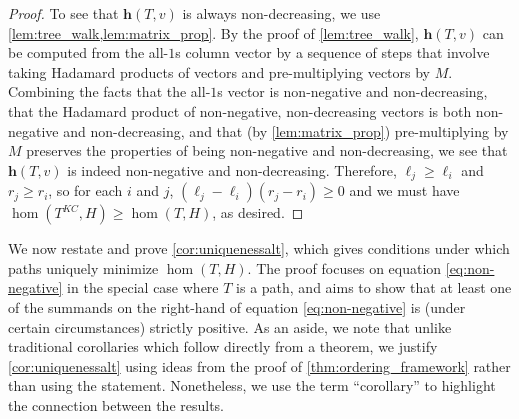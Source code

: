 \documentclass[11pt]{article}
\theoremstyle{definition}
\begin{document}
\begin{proof}
To see that $\mathbf{h}(T,v)$ is always non-decreasing, we use \cref{lem:tree_walk,lem:matrix_prop}. By the proof of \cref{lem:tree_walk}, $\mathbf{h}(T,v)$ can be computed from the all-$1$s column vector by a sequence of steps that involve taking Hadamard products of vectors and pre-multiplying vectors by $M$. Combining the facts that the all-$1$s vector is non-negative and non-decreasing, that the Hadamard product of non-negative, non-decreasing vectors is both non-negative and non-decreasing, and that (by \cref{lem:matrix_prop}) pre-multiplying by $M$ preserves the properties of being non-negative and non-decreasing, we see that $\mathbf{h}(T,v)$ is indeed non-negative and non-decreasing. Therefore, $\ell_j \ge \ell_i$ and $r_j \ge r_i$, so for each $i$ and $j$, $(\ell_j-\ell_i)(r_j-r_i) \ge 0$ and we must have $\hom(T^{KC},H) \ge \hom(T,H)$, as desired.
\end{proof}

We now restate and prove \cref{cor:uniquenessalt}, which gives conditions under which paths uniquely minimize $\hom(T,H)$. The proof focuses on equation \eqref{eq:non-negative} in the special case where $T$ is a path, and aims to show that at least one of the summands on the right-hand of equation \eqref{eq:non-negative} is (under certain circumstances) strictly positive. As an aside, we note that unlike traditional corollaries which follow directly from a theorem, we justify \cref{cor:uniquenessalt} using ideas from the proof of \cref{thm:ordering_framework} rather than using the statement. Nonetheless, we use the term ``corollary'' to highlight the connection between the results. %

\uniquenessalt*
\end{document}
